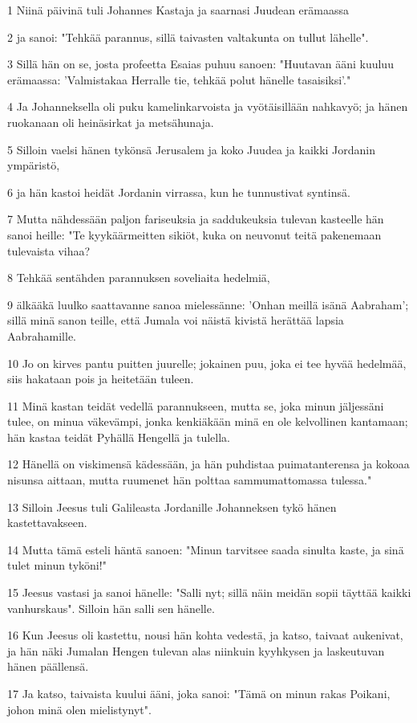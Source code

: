 \par 1 Niinä päivinä tuli Johannes Kastaja ja saarnasi Juudean erämaassa
\par 2 ja sanoi: "Tehkää parannus, sillä taivasten valtakunta on tullut lähelle".
\par 3 Sillä hän on se, josta profeetta Esaias puhuu sanoen: "Huutavan ääni kuuluu erämaassa: 'Valmistakaa Herralle tie, tehkää polut hänelle tasaisiksi'."
\par 4 Ja Johanneksella oli puku kamelinkarvoista ja vyötäisillään nahkavyö; ja hänen ruokanaan oli heinäsirkat ja metsähunaja.
\par 5 Silloin vaelsi hänen tykönsä Jerusalem ja koko Juudea ja kaikki Jordanin ympäristö,
\par 6 ja hän kastoi heidät Jordanin virrassa, kun he tunnustivat syntinsä.
\par 7 Mutta nähdessään paljon fariseuksia ja saddukeuksia tulevan kasteelle hän sanoi heille: "Te kyykäärmeitten sikiöt, kuka on neuvonut teitä pakenemaan tulevaista vihaa?
\par 8 Tehkää sentähden parannuksen soveliaita hedelmiä,
\par 9 älkääkä luulko saattavanne sanoa mielessänne: 'Onhan meillä isänä Aabraham'; sillä minä sanon teille, että Jumala voi näistä kivistä herättää lapsia Aabrahamille.
\par 10 Jo on kirves pantu puitten juurelle; jokainen puu, joka ei tee hyvää hedelmää, siis hakataan pois ja heitetään tuleen.
\par 11 Minä kastan teidät vedellä parannukseen, mutta se, joka minun jäljessäni tulee, on minua väkevämpi, jonka kenkiäkään minä en ole kelvollinen kantamaan; hän kastaa teidät Pyhällä Hengellä ja tulella.
\par 12 Hänellä on viskimensä kädessään, ja hän puhdistaa puimatanterensa ja kokoaa nisunsa aittaan, mutta ruumenet hän polttaa sammumattomassa tulessa."
\par 13 Silloin Jeesus tuli Galileasta Jordanille Johanneksen tykö hänen kastettavakseen.
\par 14 Mutta tämä esteli häntä sanoen: "Minun tarvitsee saada sinulta kaste, ja sinä tulet minun tyköni!"
\par 15 Jeesus vastasi ja sanoi hänelle: "Salli nyt; sillä näin meidän sopii täyttää kaikki vanhurskaus". Silloin hän salli sen hänelle.
\par 16 Kun Jeesus oli kastettu, nousi hän kohta vedestä, ja katso, taivaat aukenivat, ja hän näki Jumalan Hengen tulevan alas niinkuin kyyhkysen ja laskeutuvan hänen päällensä.
\par 17 Ja katso, taivaista kuului ääni, joka sanoi: "Tämä on minun rakas Poikani, johon minä olen mielistynyt".

